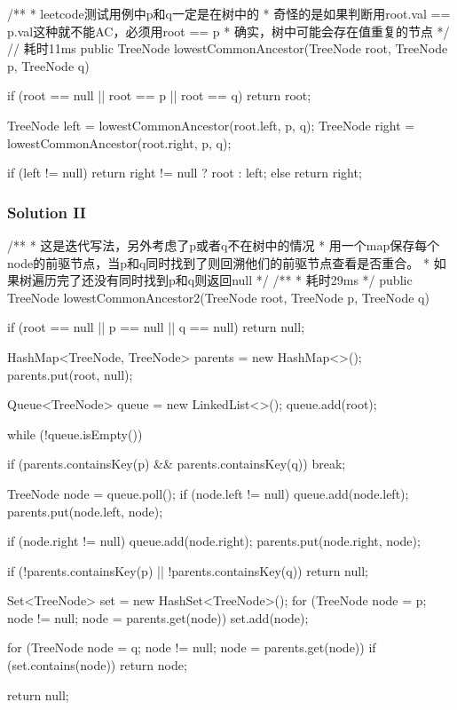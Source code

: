 \begin{Code}
/**
 * leetcode测试用例中p和q一定是在树中的
 * 奇怪的是如果判断用root.val == p.val这种就不能AC，必须用root == p
 * 确实，树中可能会存在值重复的节点
 */
// 耗时11ms
public TreeNode lowestCommonAncestor(TreeNode root, TreeNode p, TreeNode q) {
    if (root == null || root == p || root == q) {
        return root;
    }

    TreeNode left = lowestCommonAncestor(root.left, p, q);
    TreeNode right = lowestCommonAncestor(root.right, p, q);

    if (left != null) {
        return right != null ? root : left;
    } else {
        return right;
    }
}
\end{Code}

\newpage

\subsubsection{Solution II}

\begin{Code}

/**
 * 这是迭代写法，另外考虑了p或者q不在树中的情况
 * 用一个map保存每个node的前驱节点，当p和q同时找到了则回溯他们的前驱节点查看是否重合。
 * 如果树遍历完了还没有同时找到p和q则返回null
 */
/**
 * 耗时29ms
 */
public TreeNode lowestCommonAncestor2(TreeNode root, TreeNode p, TreeNode q) {
    if (root == null || p == null || q == null) {
        return null;
    }

    HashMap<TreeNode, TreeNode> parents = new HashMap<>();
    parents.put(root, null);

    Queue<TreeNode> queue = new LinkedList<>();
    queue.add(root);

    while (!queue.isEmpty()) {
        if (parents.containsKey(p) && parents.containsKey(q)) {
            break;
        }

        TreeNode node = queue.poll();
        if (node.left != null) {
            queue.add(node.left);
            parents.put(node.left, node);
        }

        if (node.right != null) {
            queue.add(node.right);
            parents.put(node.right, node);
        }
    }

    if (!parents.containsKey(p) || !parents.containsKey(q)) {
        return null;
    }

    Set<TreeNode> set = new HashSet<TreeNode>();
    for (TreeNode node = p; node != null; node = parents.get(node)) {
        set.add(node);
    }

    for (TreeNode node = q; node != null; node = parents.get(node)) {
        if (set.contains(node)) {
            return node;
        }
    }

    return null;
}
\end{Code}

